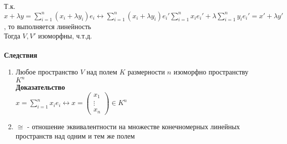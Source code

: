 \documentclass[12pt]{article}
\begin{document}
Т.к. $x+\lambda y = \sum_{i=1}^n (x_i+\lambda y_i)e_i \leftrightarrow \sum_{i=1}^n (x_i+\lambda y_i)e_i' \sum_{i=1}^n x_ie_i' + \lambda \sum_{i=1}^n y_ie_i' = x' + \lambda y'$, то выполняется линейность\\
Тогда $V, V'$ изоморфны, ч.т.д.\\\\
\textbf{Следствия}
\begin{enumerate}
    \item Любое пространство $V$ над полем $K$ размерности $n$ изоморфно пространству $K^n$\\
    \textbf{Доказательство}\\
    $x = \sum_{i=1}^n x_ie_i \leftrightarrow x = \begin{pmatrix}
        x_1\\
        \vdots\\
        x_n
    \end{pmatrix} \in K^n$
    \item $\cong$ - отношение эквивалентности на множестве конечномерных линейных пространств над одним и тем же полем
\end{enumerate}
\end{document}

